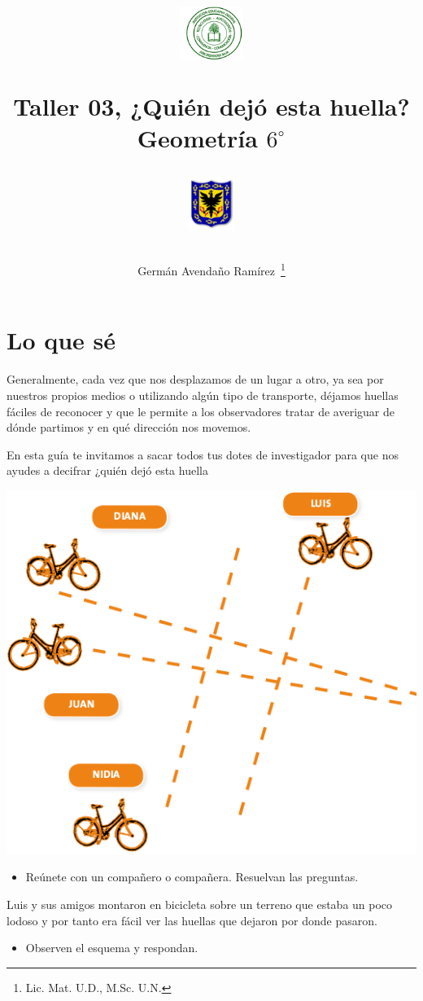 \documentclass[twoside]{article}
\author{Germ\'an Avenda\~no Ram\'irez~\thanks{Lic. Mat. U.D., M.Sc. U.N.}}
\title{\begin{minipage}{.2\textwidth}
\includegraphics[height=1.75cm]{Images/logo-colegio.png}\end{minipage}
\begin{minipage}{.55\textwidth}
\begin{center}
Taller 03, ¿Quién dejó esta huella?\\
Geometría $6^{\circ}$
\end{center}
\end{minipage}\hfill
\begin{minipage}{.2\textwidth}
\includegraphics[height=1.75cm]{Images/logo-sed.png} 
\end{minipage}}
\date{}
\begin{document}
\maketitle
 \section*{Lo que s\'e}
 Generalmente, cada vez que nos desplazamos de un lugar a otro, ya sea por nuestros propios medios o utilizando algún tipo de transporte, déjamos huellas fáciles de reconocer y que le permite a los observadores tratar de averiguar de dónde partimos y en qué dirección nos movemos.

En esta guía te invitamos a sacar todos tus dotes de investigador para que nos ayudes a decifrar ¿quién dejó esta huella

\begin{minipage}{.65\textwidth}
\includegraphics[scale=.45]{Images/Carreras_bicicletas.png}
\end{minipage}\hfill
\begin{minipage}{.3\textwidth}
\begin{itemize}
\item Reúnete con un compañero o compañera. Resuelvan las preguntas.
\end{itemize}
Luis y sus amigos montaron en bicicleta sobre un terreno que estaba un poco lodoso y por tanto era fácil ver las huellas que dejaron por donde pasaron.
\begin{itemize}
\item Observen el esquema y respondan.
\end{itemize}
\end{minipage}
\end{document}
